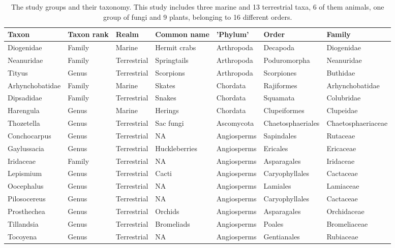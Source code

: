 \documentclass[
  12pt,
]{article}
\begin{document}
\begin{landscape}\begin{table}

\caption{\label{tab:tabletaxa}The study groups and their taxonomy. This study includes three marine and 13 terrestrial taxa, 6 of them animals, one group of fungi and 9 plants, belonging to 16 different orders.}
\centering
\fontsize{11}{13}\selectfont
\begin{tabular}[t]{>{\raggedright\arraybackslash}p{2.5cm}>{\raggedright\arraybackslash}p{2cm}>{\raggedright\arraybackslash}p{2cm}>{\raggedright\arraybackslash}p{2.5cm}>{\raggedright\arraybackslash}p{2.5cm}ll}
\toprule
Taxon & Taxon rank & Realm & Common name & 'Phylum' & Order & Family\\
\midrule
Diogenidae & Family & Marine & Hermit crabs & Arthropoda & Decapoda & Diogenidae\\
Neanuridae & Family & Terrestrial & Springtails & Arthropoda & Poduromorpha & Neanuridae\\
Tityus & Genus & Terrestrial & Scorpions & Arthropoda & Scorpiones & Buthidae\\
Arhynchobatidae & Family & Marine & Skates & Chordata & Rajiformes & Arhynchobatidae\\
Dipsadidae & Family & Terrestrial & Snakes & Chordata & Squamata & Colubridae\\
\addlinespace
Harengula & Genus & Marine & Herings & Chordata & Clupeiformes & Clupeidae\\
\hline
Thozetella & Genus & Terrestrial & Sac fungi & Ascomycota & Chaetosphaeriales & Chaetosphaeriaceae\\
\hline
Conchocarpus & Genus & Terrestrial & NA & Angiosperms & Sapindales & Rutaceae\\
Gaylussacia & Genus & Terrestrial & Huckleberries & Angiosperms & Ericales & Ericaceae\\
Iridaceae & Family & Terrestrial & NA & Angiosperms & Asparagales & Iridaceae\\
\addlinespace
Lepismium & Genus & Terrestrial & Cacti & Angiosperms & Caryophyllales & Cactaceae\\
Oocephalus & Genus & Terrestrial & NA & Angiosperms & Lamiales & Lamiaceae\\
Pilosocereus & Genus & Terrestrial & NA & Angiosperms & Caryophyllales & Cactaceae\\
Prosthechea & Genus & Terrestrial & Orchids & Angiosperms & Asparagales & Orchidaceae\\
Tillandsia & Genus & Terrestrial & Bromeliads & Angiosperms & Poales & Bromeliaceae\\
\addlinespace
Tocoyena & Genus & Terrestrial & NA & Angiosperms & Gentianales & Rubiaceae\\
\bottomrule
\end{tabular}
\end{table}
\end{landscape}
\end{document}
